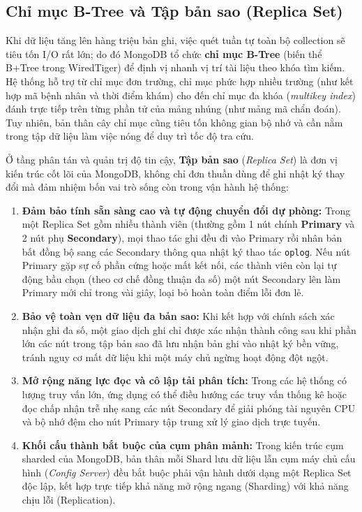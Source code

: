 \subsection{Chỉ mục B-Tree và Tập bản sao (Replica Set)}

Khi dữ liệu tăng lên hàng triệu bản ghi, việc quét tuần tự toàn bộ collection sẽ tiêu tốn I/O rất lớn; do đó MongoDB tổ chức \textbf{chỉ mục B-Tree} (biến thể B+Tree trong WiredTiger) để định vị nhanh vị trí tài liệu theo khóa tìm kiếm. Hệ thống hỗ trợ từ chỉ mục đơn trường, chỉ mục phức hợp nhiều trường (như kết hợp mã bệnh nhân và thời điểm khám) cho đến chỉ mục đa khóa (\textit{multikey index}) đánh trực tiếp trên từng phần tử của mảng nhúng (như mảng mã chẩn đoán). Tuy nhiên, bản thân cây chỉ mục cũng tiêu tốn không gian bộ nhớ và cần nằm trong tập dữ liệu làm việc nóng để duy trì tốc độ tra cứu.

Ở tầng phân tán và quản trị độ tin cậy, \textbf{Tập bản sao} (\textit{Replica Set}) là đơn vị kiến trúc cốt lõi của MongoDB, không chỉ đơn thuần dùng để ghi nhật ký thay đổi mà đảm nhiệm bốn vai trò sống còn trong vận hành hệ thống:

\begin{enumerate}[leftmargin=0.8cm, itemsep=4pt]
  \item \textbf{Đảm bảo tính sẵn sàng cao và tự động chuyển đổi dự phòng:} Trong một Replica Set gồm nhiều thành viên (thường gồm 1 nút chính \textbf{Primary} và 2 nút phụ \textbf{Secondary}), mọi thao tác ghi đều đi vào Primary rồi nhân bản bất đồng bộ sang các Secondary thông qua nhật ký thao tác \texttt{oplog}. Nếu nút Primary gặp sự cố phần cứng hoặc mất kết nối, các thành viên còn lại tự động bầu chọn (theo cơ chế đồng thuận đa số) một nút Secondary lên làm Primary mới chỉ trong vài giây, loại bỏ hoàn toàn điểm lỗi đơn lẻ.
  \item \textbf{Bảo vệ toàn vẹn dữ liệu đa bản sao:} Khi kết hợp với chính sách xác nhận ghi đa số, một giao dịch ghi chỉ được xác nhận thành công sau khi phần lớn các nút trong tập bản sao đã lưu nhận bản ghi vào nhật ký bền vững, tránh nguy cơ mất dữ liệu khi một máy chủ ngừng hoạt động đột ngột.
  \item \textbf{Mở rộng năng lực đọc và cô lập tải phân tích:} Trong các hệ thống có lượng truy vấn lớn, ứng dụng có thể điều hướng các truy vấn thống kê hoặc đọc chấp nhận trễ nhẹ sang các nút Secondary để giải phóng tài nguyên CPU và bộ nhớ đệm cho nút Primary tập trung xử lý giao dịch trực tuyến.
  \item \textbf{Khối cấu thành bắt buộc của cụm phân mảnh:} Trong kiến trúc cụm sharded của MongoDB, bản thân mỗi Shard lưu dữ liệu lẫn cụm máy chủ cấu hình (\textit{Config Server}) đều bắt buộc phải vận hành dưới dạng một Replica Set độc lập, kết hợp trực tiếp khả năng mở rộng ngang (Sharding) với khả năng chịu lỗi (Replication).
\end{enumerate}

